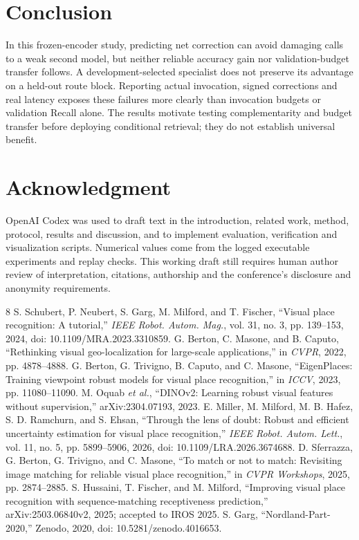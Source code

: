 \documentclass[conference]{IEEEtran}
\begin{document}
\section{Conclusion}
In this frozen-encoder study, predicting net correction can avoid damaging
calls to a weak second model, but neither reliable accuracy gain nor
validation-budget transfer follows. A development-selected specialist
does not preserve its advantage on a held-out route block. Reporting actual
invocation, signed corrections and real latency exposes these failures
more clearly than invocation budgets or validation Recall alone.
The results motivate testing complementarity and budget transfer before
deploying conditional retrieval; they do not establish universal benefit.

\section*{Acknowledgment}
OpenAI Codex was used to draft text in the introduction, related work,
method, protocol, results and discussion, and to implement evaluation,
verification and visualization scripts. Numerical values come from the
logged executable experiments and replay checks. This working draft still
requires human author review of interpretation, citations, authorship and
the conference's disclosure and anonymity requirements.

\begin{thebibliography}{8}
 S. Schubert, P. Neubert, S. Garg, M. Milford, and
T. Fischer, ``Visual place recognition: A tutorial,'' \emph{IEEE Robot.
Autom. Mag.}, vol. 31, no. 3, pp. 139--153, 2024,
doi: 10.1109/MRA.2023.3310859.
 G. Berton, C. Masone, and B. Caputo, ``Rethinking visual
geo-localization for large-scale applications,'' in \emph{CVPR}, 2022,
pp. 4878--4888.
 G. Berton, G. Trivigno, B. Caputo, and C. Masone,
``EigenPlaces: Training viewpoint robust models for visual place
recognition,'' in \emph{ICCV}, 2023, pp. 11080--11090.
 M. Oquab \emph{et al.}, ``DINOv2: Learning robust visual
features without supervision,'' arXiv:2304.07193, 2023.
 E. Miller, M. Milford, M. B. Hafez, S. D. Ramchurn, and
S. Ehsan, ``Through the lens of doubt: Robust and efficient uncertainty
estimation for visual place recognition,'' \emph{IEEE Robot. Autom. Lett.},
vol. 11, no. 5, pp. 5899--5906, 2026, doi: 10.1109/LRA.2026.3674688.
 D. Sferrazza, G. Berton, G. Trivigno, and C. Masone,
``To match or not to match: Revisiting image matching for reliable visual
place recognition,'' in \emph{CVPR Workshops}, 2025, pp. 2874--2885.
 S. Hussaini, T. Fischer, and M. Milford, ``Improving visual
place recognition with sequence-matching receptiveness prediction,''
arXiv:2503.06840v2, 2025; accepted to IROS 2025.
 S. Garg, ``Nordland-Part-2020,'' Zenodo, 2020,
doi: 10.5281/zenodo.4016653.
\end{thebibliography}
\end{document}
